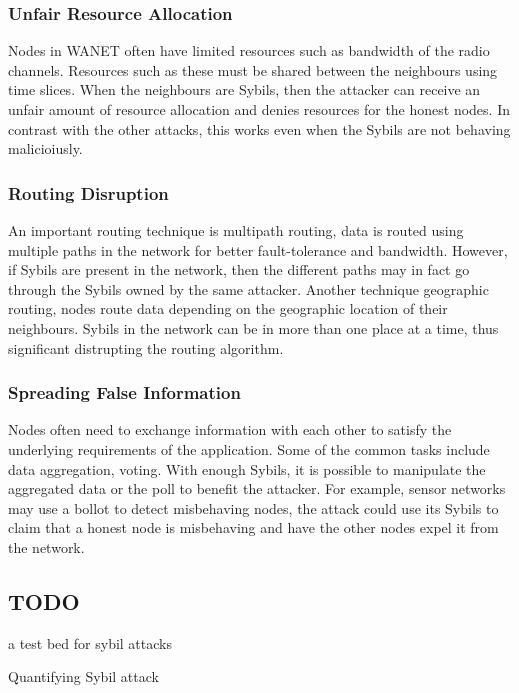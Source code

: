 \subsubsection{Unfair Resource Allocation}
Nodes in WANET often have limited resources such as bandwidth of the radio
channels. Resources such as these must be shared between the neighbours using
time slices. When the neighbours are Sybils, then the attacker can receive an
unfair amount of resource allocation and denies resources for the honest
nodes\cite{newsome2004sybil}. In contrast with the other attacks, this works
even when the Sybils are not behaving malicioiusly.

\subsubsection{Routing Disruption}
An important routing technique is multipath routing, data is routed using
multiple paths in the network for better fault-tolerance and bandwidth. However,
if Sybils are present in the network, then the different paths may in fact go
through the Sybils owned by the same attacker. Another technique geographic
routing, nodes route data depending on the geographic location of their
neighbours. Sybils in the network can be in more than one place at a time, thus
significant distrupting the routing algorithm\cite{karlof2003secure}.

\subsubsection{Spreading False Information}
Nodes often need to exchange information with each other to satisfy the
underlying requirements of the application. Some of the common tasks include
data aggregation, voting. With enough Sybils, it is possible to manipulate the
aggregated data or the poll to benefit the attacker. For example, sensor
networks may use a bollot to detect misbehaving nodes, the attack could use its
Sybils to claim that a honest node is misbehaving and have the other nodes expel
it from the network\cite{newsome2004sybil}.


\subsection{TODO}
a test bed for sybil attacks\cite{irissappane2012towards}

Quantifying Sybil attack\cite{margolin2008quantifying}

